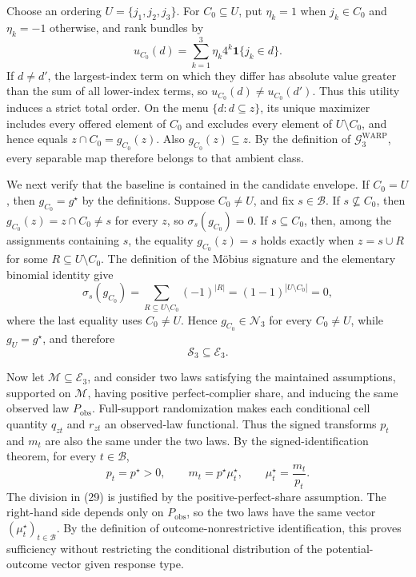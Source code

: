 Choose an ordering \(U=\{j_1,j_2,j_3\}\).  For \(C_0\subseteq U\), put \(\eta_k=1\) when \(j_k\in C_0\) and \(\eta_k=-1\) otherwise, and rank bundles by
\[
u_{C_0}(d)=\sum_{k=1}^3 \eta_k4^k\mathbf 1\{j_k\in d\}.
\]
If \(d\ne d'\), the largest-index term on which they differ has absolute value greater than the sum of all lower-index terms, so \(u_{C_0}(d)\ne u_{C_0}(d')\).  Thus this utility induces a strict total order.  On the menu \(\{d:d\subseteq z\}\), its unique maximizer includes every offered element of \(C_0\) and excludes every element of \(U\setminus C_0\), and hence equals \(z\cap C_0=g_{C_0}(z)\).  Also \(g_{C_0}(z)\subseteq z\).  By the definition of \(\mathcal G^{\mathrm{WARP}}_3\), every separable map therefore belongs to that ambient class.

We next verify that the baseline is contained in the candidate envelope.  If \(C_0=U\), then \(g_{C_0}=g^\star\) by the definitions.  Suppose \(C_0\ne U\), and fix \(s\in\mathcal B\).  If \(s\not\subseteq C_0\), then \(g_{C_0}(z)=z\cap C_0\ne s\) for every \(z\), so \(\sigma_s(g_{C_0})=0\).  If \(s\subseteq C_0\), then, among the assignments containing \(s\), the equality \(g_{C_0}(z)=s\) holds exactly when \(z=s\cup R\) for some \(R\subseteq U\setminus C_0\).  The definition of the Möbius signature and the elementary binomial identity give
\[
\sigma_s(g_{C_0})
=\sum_{R\subseteq U\setminus C_0}(-1)^{|R|}
=(1-1)^{|U\setminus C_0|}=0,
\]
where the last equality uses \(C_0\ne U\).  Hence \(g_{C_0}\in\mathcal N_3\) for every \(C_0\ne U\), while \(g_U=g^\star\), and therefore
\[
\mathcal S_3\subseteq\mathcal E_3. \tag{28}
\]

Now let \(\mathcal M\subseteq\mathcal E_3\), and consider two laws satisfying the maintained assumptions, supported on \(\mathcal M\), having positive perfect-complier share, and inducing the same observed law \(P_{\mathrm{obs}}\).  Full-support randomization makes each conditional cell quantity \(q_{zt}\) and \(r_{zt}\) an observed-law functional.  Thus the signed transforms \(p_t\) and \(m_t\) are also the same under the two laws.  By the signed-identification theorem, for every \(t\in\mathcal B\),
\[
p_t=p^\star>0,
\qquad
m_t=p^\star\mu_t^\star,
\qquad
\mu_t^\star=\frac{m_t}{p_t}. \tag{29}
\]
The division in (29) is justified by the positive-perfect-share assumption.  The right-hand side depends only on \(P_{\mathrm{obs}}\), so the two laws have the same vector \((\mu_t^\star)_{t\in\mathcal B}\).  By the definition of outcome-nonrestrictive identification, this proves sufficiency without restricting the conditional distribution of the potential-outcome vector given response type.

